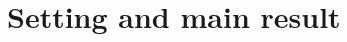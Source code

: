 \documentclass{report}
\theoremstyle{remark}
\theoremstyle{definition}
\begin{document}
\chapter{Setting and main result}
\begin{itemize}

\end{itemize}
\end{document}

